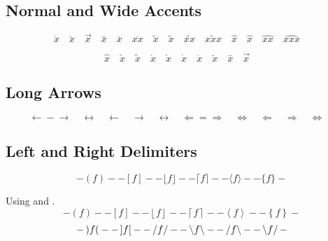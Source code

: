 \documentclass[11pt, a4paper, oneside]{article}
\theoremstyle{Plain}
\theoremstyle{Definition}
\theoremstyle{Remark}
\begin{document}
\begin{appendix}
	\subsection{Normal and Wide Accents \showfamily}

	\begin{displaymath}
	  \dot{x} \quad
	  \ddot{x} \quad
	  \vec{x} \quad
	  \bar{x} \quad
	  \overline{x} \quad
	  \overline{xx} \quad
	  \tilde{x} \quad
	  \widetilde{x} \quad
	  \widetilde{xx} \quad
	  \widetilde{xxx} \quad
	  \hat{x} \quad
	  \widehat{x} \quad
	  \widehat{xx} \quad
	  \widehat{xxx} \quad
	\end{displaymath}

	\begin{displaymath}
	  \hat{x} \quad
	  \check{x} \quad
	  \tilde{x} \quad
	  \acute{x} \quad
	  \grave{x} \quad
	  \dot{x} \quad
	  \ddot{x} \quad
	  \breve{x} \quad
	  \bar{x} \quad
	  \vec{x} \quad
	\end{displaymath}

	\subsection{Long Arrows \showfamily}

	\begin{displaymath}
	  \leftarrow \mathrel{-} \rightarrow \quad
	  \leftrightarrow \quad
	  \longleftarrow  \quad
	  \longrightarrow \quad
	  \longleftrightarrow \quad
	  \Leftarrow = \Rightarrow \quad
	  \Leftrightarrow \quad
	  \Longleftarrow  \quad
	  \Longrightarrow \quad
	  \Longleftrightarrow \quad
	\end{displaymath}

	\subsection{Left and Right Delimiters \showfamily}

	\def\testdelim#1#2{ - #1 f #2 - }
	\begin{displaymath}
	  \testdelim()
	  \testdelim[]
	  \testdelim\lfloor\rfloor
	  \testdelim\lceil\rceil
	  \testdelim\langle\rangle
	  \testdelim\{\}
	\end{displaymath}

	Using {\tt\string\left} and {\tt\string\right}.
	\def\testdelim#1#2{ - \left#1 f \right#2 - }
	\begin{displaymath}
	  \testdelim()
	  \testdelim[]
	  \testdelim\lfloor\rfloor
	  \testdelim\lceil\rceil
	  \testdelim\langle\rangle
	  \testdelim\{\}
	\end{displaymath}
	\begin{displaymath}
	  \testdelim)(
	  \testdelim][
	  \testdelim//
	  \testdelim\backslash\backslash
	  \testdelim/\backslash
	  \testdelim\backslash/
	\end{displaymath}


\end{appendix}
\end{document}
